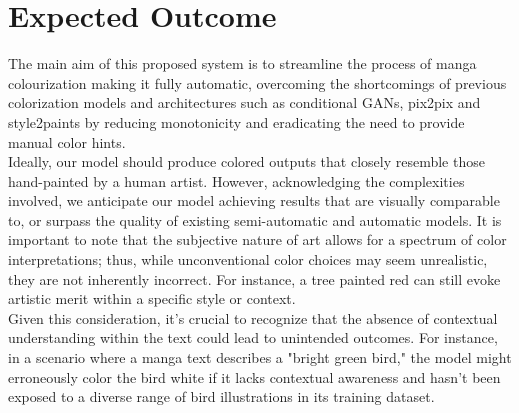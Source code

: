 \setcounter{page}{37}
\chapter{Expected Outcome}
The main aim of this proposed system is to streamline the process of manga colourization making it fully automatic, overcoming the shortcomings of previous colorization models and architectures such as conditional GANs\cite{10.1007/978-3-030-72610-2_17}, pix2pix\cite{isola2018imagetoimage} and style2paints\cite{ACPR2017ZLM} by reducing monotonicity and eradicating the need to provide manual color hints.\\

Ideally, our model should produce colored outputs that closely resemble those hand-painted by a human artist. However, acknowledging the complexities involved, we anticipate our model achieving results that are visually comparable to, or surpass the quality of existing semi-automatic and automatic models. It is  important to note that the subjective nature of art allows for a spectrum of color interpretations; thus, while unconventional color choices may seem unrealistic, they are not inherently incorrect. For instance, a tree painted red can still evoke artistic merit within a specific style or context. \\

Given this consideration, it's crucial to recognize that the absence of contextual understanding within the text could lead to unintended outcomes. For instance, in a scenario where a manga text describes a "bright green bird," the model might erroneously color the bird white if it lacks contextual awareness and hasn't been exposed to a diverse range of bird illustrations in its training dataset.


